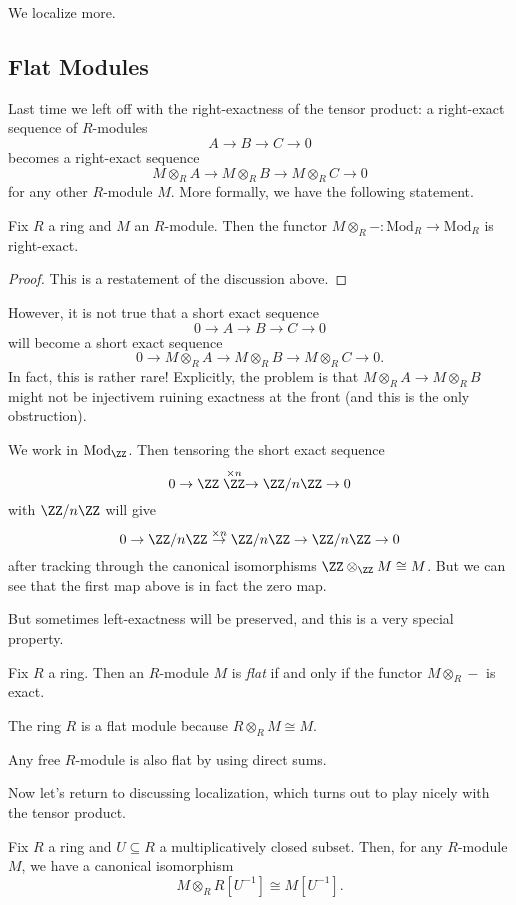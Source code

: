 
We localize more.

\subsection{Flat Modules}
Last time we left off with the right-exactness of the tensor product: a right-exact sequence of $R$-modules
\[A\to B\to C\to 0\]
becomes a right-exact sequence
\[M\otimes_RA\to M\otimes_RB\to M\otimes_RC\to 0\]
for any other $R$-module $M$. More formally, we have the following statement.
\begin{proposition}
	Fix $R$ a ring and $M$ an $R$-module. Then the functor $M\otimes_R-:\mathrm{Mod}_R\to\mathrm{Mod}_R$ is right-exact.
\end{proposition}
\begin{proof}
	This is a restatement of the discussion above.
\end{proof}
However, it is not true that a short exact sequence
\[0\to A\to B\to C\to 0\]
will become a short exact sequence
\[0\to M\otimes_RA\to M\otimes_RB\to M\otimes_RC\to 0.\]
In fact, this is rather rare! Explicitly, the problem is that $M\otimes_RA\to M\otimes_RB$ might not be injectivem ruining exactness at the front (and this is the only obstruction).
\begin{example}
	We work in $\mathrm{Mod}_\ZZ$. Then tensoring the short exact sequence
	\[0\to\ZZ\stackrel{\times n}\ZZ\to\ZZ/n\ZZ\to0\]
	with $\ZZ/n\ZZ$ will give
	\[0\to\ZZ/n\ZZ\stackrel{\times n}\to\ZZ/n\ZZ\to\ZZ/n\ZZ\to0\]
	after tracking through the canonical isomorphisms $\ZZ\otimes_\ZZ M\cong M$. But we can see that the first map above is in fact the zero map.
\end{example}
But sometimes left-exactness will be preserved, and this is a very special property.
\begin{definition}[Flat]
	Fix $R$ a ring. Then an $R$-module $M$ is \textit{flat} if and only if the functor $M\otimes_R-$ is exact.
\end{definition}
\begin{example}
	The ring $R$ is a flat module because $R\otimes_RM\cong M$.
\end{example}
\begin{example}
	Any free $R$-module is also flat by using direct sums.\todo{}
\end{example}
Now let's return to discussing localization, which turns out to play nicely with the tensor product.
\begin{proposition}
	Fix $R$ a ring and $U\subseteq R$ a multiplicatively closed subset. Then, for any $R$-module $M$, we have a canonical isomorphism
	\[M\otimes_RR\left[U^{-1}\right]\cong M\left[U^{-1}\right].\]
\end{proposition}

